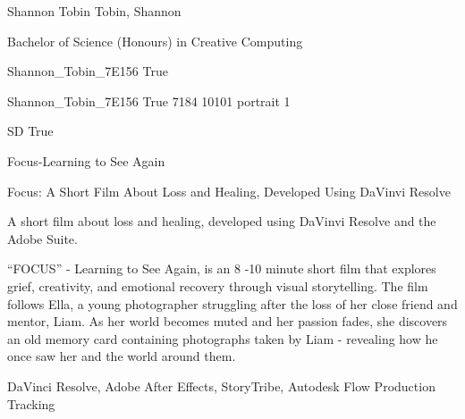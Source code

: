 
\begingroup{}\relax



\def\Key{Shannon_Tobin_7E156}

{Shannon Tobin}
{Tobin, Shannon}

{Bachelor of Science (Honours) in Creative Computing}

{Shannon_Tobin_7E156}
{True}

{Shannon_Tobin_7E156}
{True}
{7184}
{10101}
{portrait}
{1}

{SD}
{True}

{Focus-Learning to See Again}

{Focus: A Short Film About Loss and Healing, Developed Using DaVinvi Resolve}

{A short film about loss and healing, developed using DaVinvi Resolve and the Adobe Suite.

“FOCUS” - Learning to See Again, is an 8 -10 minute short film that explores grief, creativity, and emotional recovery through visual storytelling. The film follows Ella, a young photographer struggling after the loss of her close friend and mentor, Liam. As her world becomes muted and her passion fades, she discovers an old memory card containing photographs taken by Liam - revealing how he once saw her and the world around them.}

{DaVinci Resolve, Adobe After Effects, StoryTribe, Autodesk Flow Production Tracking}

